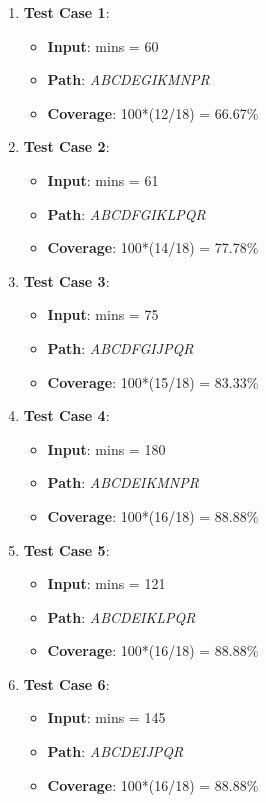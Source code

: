\documentclass[fontsize=12pt,paper=letter,twoside]{scrartcl}
\begin{document}
\begin{enumerate}

\item \textbf{Test Case 1}:
\begin{itemize}
\item \textbf{Input}: mins = 60
\item \textbf{Path}: \emph{ABCDEGIKMNPR}
\item \textbf{Coverage}: 100*(12/18) = 66.67\%
\end{itemize}

\item \textbf{Test Case 2}:
\begin{itemize}
\item \textbf{Input}: mins = 61
\item \textbf{Path}: \emph{ABCDFGIKLPQR}
\item \textbf{Coverage}: 100*(14/18) = 77.78\%
\end{itemize}

\item \textbf{Test Case 3}:
\begin{itemize}
\item \textbf{Input}: mins = 75
\item \textbf{Path}: \emph{ABCDFGIJPQR}
\item \textbf{Coverage}: 100*(15/18) = 83.33\%
\end{itemize}

\item \textbf{Test Case 4}:
\begin{itemize}
\item \textbf{Input}: mins = 180
\item \textbf{Path}: \emph{ABCDEIKMNPR}
\item \textbf{Coverage}: 100*(16/18) = 88.88\%
\end{itemize}

\item \textbf{Test Case 5}:
\begin{itemize}
\item \textbf{Input}: mins = 121
\item \textbf{Path}: \emph{ABCDEIKLPQR}
\item \textbf{Coverage}: 100*(16/18) = 88.88\%
\end{itemize}

\item \textbf{Test Case 6}:
\begin{itemize}
\item \textbf{Input}: mins = 145
\item \textbf{Path}: \emph{ABCDEIJPQR}
\item \textbf{Coverage}: 100*(16/18) = 88.88\%
\end{itemize}


\end{enumerate}
\end{document}
